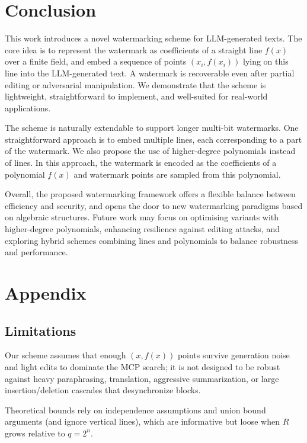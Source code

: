 \documentclass[a4paper,11pt]{llncs}
\begin{document}
\section{Conclusion}\label{sec:conclusions}
This work introduces a novel watermarking scheme for LLM-generated texts. The core idea is to represent the watermark as coefficients of a straight line $f(x)$ over a finite field, and embed a sequence of points $(x_i,f(x_i))$ lying on this line into the LLM-generated text. A watermark is recoverable even after partial editing or adversarial manipulation. We demonstrate that the scheme is lightweight, straightforward to implement, and well-suited for real-world applications.

The scheme is naturally extendable to support longer multi-bit watermarks. One straightforward approach is to embed multiple lines, each corresponding to a part of the watermark. We also propose the use of higher-degree polynomials instead of lines. In this approach, the watermark is encoded as the coefficients of a polynomial $f(x)$ and watermark points are sampled from this polynomial. 

Overall, the proposed watermarking framework offers a flexible balance between efficiency and security, and opens the door to new watermarking paradigms based on algebraic structures. Future work may focus on optimising variants with higher-degree polynomials, enhancing resilience against editing attacks, and exploring hybrid schemes combining lines and polynomials to balance robustness and performance.


\section{Appendix}
\subsection{Limitations}
Our scheme assumes that enough $(x,f(x))$ points survive generation noise and light edits to dominate the MCP search; it is not designed to be robust against heavy paraphrasing, translation, aggressive summarization, or large insertion/deletion cascades that desynchronize blocks. 

Theoretical bounds rely on independence assumptions and union bound arguments (and ignore vertical lines), which are informative but loose when $R$ grows relative to $q=2^n$. 
\end{document}
